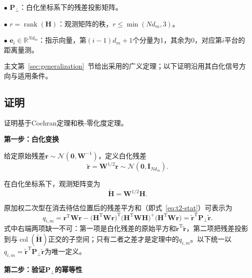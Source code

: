 \documentclass[UTF8,a4paper,zihao=-4]{ctexart}
\begin{document}
\(\bullet\) \(\mathbf{P}_{\perp}\)：白化坐标系下的残差投影矩阵。

\(\bullet\) \(r=\operatorname{rank}(\mathbf{H})\)：观测矩阵的秩，\(r\leq\min(Nd_m,3)\)。

\(\bullet\) \(\mathbf{e}_i\in\mathbb{R}^{Nd_m}\)：指示向量，第\((i-1)d_m+1\)个分量为1，其余为0，对应第\(i\)平台的距离量测。

主文第~\ref{sec:generalization}~节给出采用的广义定理；以下证明沿用其白化信号方向与适用条件。



\subsection{证明}

证明基于Cochran定理\cite{cochran1934}和秩-零化度定理\cite{seber2003linear}。

\noindent\textbf{第一步：白化变换}\par

给定原始残差\(\mathbf{r}\sim\mathcal{N}(\mathbf{0},\mathbf{W}^{-1})\)，定义白化残差
\begin{equation}
\widetilde{\mathbf{r}}=\mathbf{W}^{1/2}\mathbf{r}\sim\mathcal{N}(\mathbf{0},\mathbf{I}_{Nd_m}).
\end{equation}

在白化坐标系下，观测矩阵变为
\begin{equation}
\widetilde{\mathbf{H}}=\mathbf{W}^{1/2}\mathbf{H}.
\end{equation}

原加权二次型在消去待估位置后的残差平方和（即式~\eqref{eq:t2-stat}）可表示为
\begin{equation}
q_{i,m}=\mathbf{r}^{\mathrm{T}}\mathbf{W}\mathbf{r}
-\bigl(\mathbf{H}^{\mathrm{T}}\mathbf{W}\mathbf{r}\bigr)^{\mathrm{T}}
\bigl(\mathbf{H}^{\mathrm{T}}\mathbf{W}\mathbf{H}\bigr)^{+}
\bigl(\mathbf{H}^{\mathrm{T}}\mathbf{W}\mathbf{r}\bigr)
=\widetilde{\mathbf{r}}^{\mathrm{T}}\mathbf{P}_{\perp}\widetilde{\mathbf{r}}.
\end{equation}
式中右端两项缺一不可：第一项是白化残差的原始平方和\(\widetilde{\mathbf{r}}^{\mathrm{T}}\widetilde{\mathbf{r}}\)，第二项把残差投影到与\(\operatorname{col}(\widetilde{\mathbf{H}})\)正交的子空间；只有二者之差才是定理中的\(q_{i,m}\)。以下统一以\(q_{i,m}=\widetilde{\mathbf{r}}^{\mathrm{T}}\mathbf{P}_{\perp}\widetilde{\mathbf{r}}\)为唯一定义。

\noindent\textbf{第二步：验证\(\mathbf{P}_{\perp}\)的幂等性}\par
\end{document}
